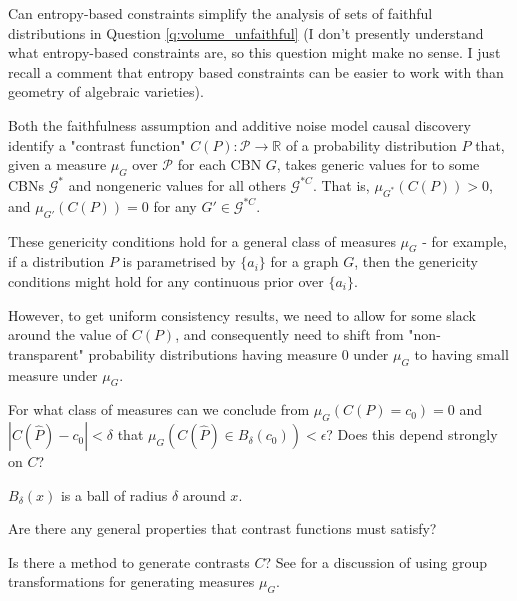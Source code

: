 \begin{question}
    Can entropy-based constraints simplify the analysis of sets of faithful distributions in Question \ref{q:volume_unfaithful} (I don't presently understand what entropy-based constraints are, so this question might make no sense. I just recall a comment that entropy based constraints can be easier to work with than geometry of algebraic varieties).
\end{question}

Both the faithfulness assumption and additive noise model causal discovery identify a "contrast function" $C(P):\mathcal{P}\to\mathbb{R}$ of a probability distribution $P$ that, given a measure $\mu_G$ over $\mathcal{P}$ for each CBN $G$, takes generic values for to some CBNs $\mathcal{G}^*$ and nongeneric values for all others $\mathcal{G}^{*C}$. That is, $\mu_{G^*}(C(P))>0$, and $\mu_{G'}(C(P))=0$ for any $G'\in\mathcal{G}^{*C}$.

\begin{question}\label{q:generalised_genericity}
    These genericity conditions hold for a general class of measures $\mu_G$ - for example, if a distribution $P$ is parametrised by $\{a_i\}$ for a graph $G$, then the genericity conditions might hold for any continuous prior over $\{a_i\}$.
    
    However, to get uniform consistency results, we need to allow for some slack around the value of $C(P)$, and consequently need to shift from "non-transparent" probability distributions having measure 0 under $\mu_G$ to having small measure under $\mu_G$.
    
    For what class of measures can we conclude from $\mu_G(C(P)=c_0)=0$ and $|C(\hat{P})-c_0|<\delta$ that $\mu_G(C(\hat{P})\in B_\delta (c_0)) < \epsilon$? Does this depend strongly on $C$?
    
    $B_\delta(x)$ is a ball of radius $\delta$ around $x$.
\end{question}
    
\begin{question}
    Are there any general properties that contrast functions must satisfy?
\end{question}

\begin{question}
    Is there a method to generate contrasts $C$? See \cite{besserve_group_2017} for a discussion of using group transformations for generating measures $\mu_G$.
\end{question}
